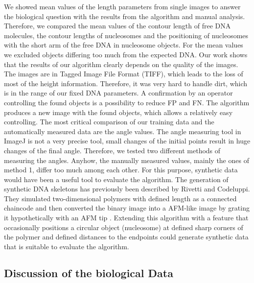 \documentclass{article}
\begin{document}
We showed mean values of the length parameters from single images to answer the biological question with the results from the algorithm and manual analysis. Therefore, we compared the mean values of the contour length of free DNA molecules, the contour lengths of nucleosomes and the positioning of nucleosomes with the short arm of the free DNA in nucleosome objects. For the mean values we excluded objects differing too much from the expected DNA. 
Our work shows that the results of our algorithm clearly depends on the quality of the images. The images are in Tagged Image File Format (TIFF), which leads to the loss of most of the height information. Therefore, it was very hard to handle dirt, which is in the range of our fixed DNA parameters. A confirmation by an operator controlling the found objects is a possibility to reduce FP and FN. The algorithm produces a new image with the found objects, which allows a relatively easy controlling. 
The most critical comparison of our training data and the automatically measured data are the angle values. The angle measuring tool in ImageJ is not a very precise tool, small changes of the initial points result in huge changes of the final angle. Therefore, we tested two different methods of measuring the angles. Anyhow, the manually measured values, mainly the ones of method 1, differ too much among each other. For this purpose, synthetic data would have been a useful tool to evaluate the algorithm. The generation of synthetic DNA skeletons has previously been described by Rivetti and Codeluppi. They simulated two-dimensional polymers with defined length as a connected chaincode and then converted the binary image into a AFM-like image by grating it hypothetically with an AFM tip \cite{rivetti2001accurate}. Extending this algorithm with a feature that occasionally positions a circular object (nucleosome) at defined sharp corners of the polymer and defined distances to the endpoints could generate synthetic data that is suitable to evaluate the algorithm. 

\subsection{Discussion of the biological Data}
\end{document}
